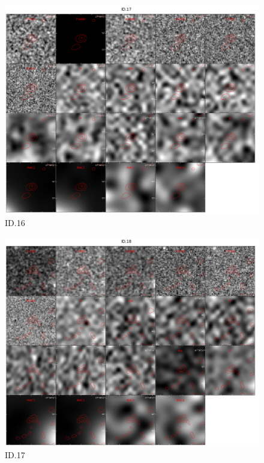 \begin{figure}[tbp]
\centering \includegraphics[width=120mm]{Matched/ASPECS_Cutout_16.jpg}
\caption{ID.16}
\label{fig:Match_Three}
\end{figure}

\begin{figure}[tbp]
\centering \includegraphics[width=120mm]{Matched/ASPECS_Cutout_17.jpg}
\caption{ID.17}
\label{fig:Match_Three}
\end{figure}


